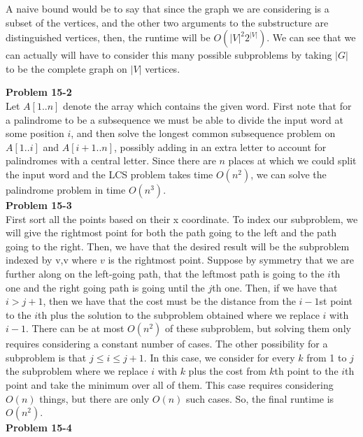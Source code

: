 \documentclass{article}
\begin{document}
A naive bound would be to say that since the graph we are considering is a subset of the vertices, and the other two arguments to the substructure are distinguished vertices, then, the runtime will be $O(|V|^2 2^{|V|})$. We can see that we can actually will have to consider this many possible subproblems by taking $|G|$ to be the complete graph on $|V|$ vertices.

\noindent\textbf{Problem 15-2}\\

Let $A[1..n]$ denote the array which contains the given word.  First note that for a palindrome to be a subsequence we must be able to divide the input word at some position $i$, and then solve the longest common subsequence problem on $A[1..i]$ and $A[i+1..n]$, possibly adding in an extra letter to account for palindromes with a central letter. Since there are $n$ places at which we could split the input word and the LCS problem takes time $O(n^2)$, we can solve the palindrome problem in time $O(n^3)$. \\

\noindent\textbf{Problem 15-3}\\

First sort all the points based on their x coordinate. To index our subproblem, we will give the rightmost point for both the path going to the left and the path going to the right. Then, we have that the desired result will be the subproblem indexed by v,v where $v$ is the rightmost point.	Suppose by symmetry that we are further along on the left-going path, that the leftmost path is going to the $i$th one and the right going path is going until the $j$th one. Then, if we have that $i>j+1$, then we have that the cost must be the distance from the $i-1$st point to the $i$th plus the solution to the subproblem obtained where we replace $i$ with $i-1$. There can be at most $O(n^2)$ of these subproblem, but solving them only requires considering a constant number of cases. The other possibility for a subproblem is that $j\le i \le j+1$. In this case, we consider for every $k$ from 1 to $j$ the subproblem where we replace $i$ with $k$ plus the cost from $k$th point to the $i$th point and take the minimum over all of them. This case requires considering $O(n)$ things, but there are only $O(n)$ such cases. So, the final runtime is $O(n^2)$.\\

\noindent\textbf{Problem 15-4}\\
\end{document}
